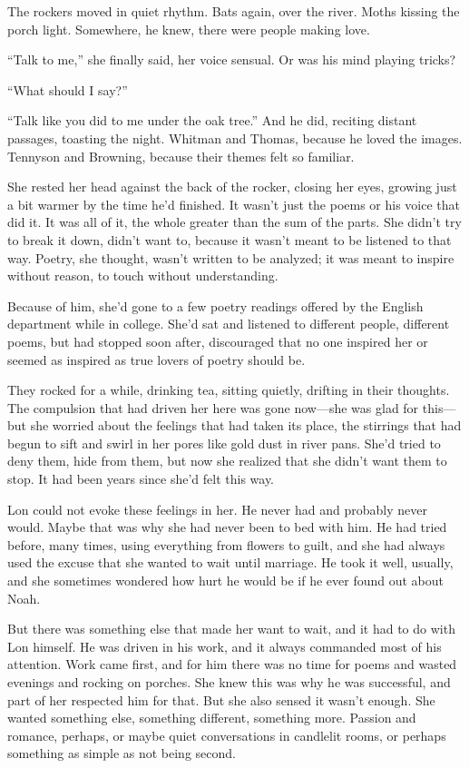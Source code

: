 \documentclass[10pt, twoside, openright]{book}
\begin{document}
The rockers moved in quiet rhythm. Bats again, over the river. Moths
kissing the porch light. Somewhere, he knew, there were people making
love.

``Talk to me,'' she finally said, her voice sensual. Or was his mind
playing tricks?


``What should I say?''


``Talk like you did to me under the oak tree.'' And he did, reciting
distant passages, toasting the night. Whitman and Thomas, because he
loved the images. Tennyson and Browning, because their themes felt so
familiar.

She rested her head against the back of the rocker, closing her eyes,
growing just a bit warmer by the time he'd finished. It wasn't just the
poems or his voice that did it. It was all of it, the whole greater than
the sum of the parts. She didn't try to break it down, didn't want to,
because it wasn't meant to be listened to that way. Poetry, she thought,
wasn't written to be analyzed; it was meant to inspire without reason,
to touch without understanding.

Because of him, she'd gone to a few poetry readings offered by the
English department while in college. She'd sat and listened to different
people, different poems, but had stopped soon after, discouraged that no
one inspired her or seemed as inspired as true lovers of poetry should
be.

They rocked for a while, drinking tea, sitting quietly, drifting in
their thoughts. The compulsion that had driven her here was gone
now---she was glad for this---but she worried about the feelings that
had taken its place, the stirrings that had begun to sift and swirl in
her pores like gold dust in river pans. She'd tried to deny them, hide
from them, but now she realized that she didn't want them to stop. It
had been years since she'd felt this way.

Lon could not evoke these feelings in her. He never had and probably
never would. Maybe that was why she had never been to bed with him. He
had tried before, many times, using everything from flowers to guilt,
and she had always used the excuse that she wanted to wait until
marriage. He took it well, usually, and she sometimes wondered how hurt
he would be if he ever found out about Noah.

But there was something else that made her want to wait, and it had to
do with Lon himself. He was driven in his work, and it always commanded
most of his attention. Work came first, and for him there was no time
for poems and wasted evenings and rocking on porches. She knew this was
why he was successful, and part of her respected him for that. But she
also sensed it wasn't enough. She wanted something else, something
different, something more. Passion and romance, perhaps, or maybe quiet
conversations in candlelit rooms, or perhaps something as simple as not
being second.
\end{document}
